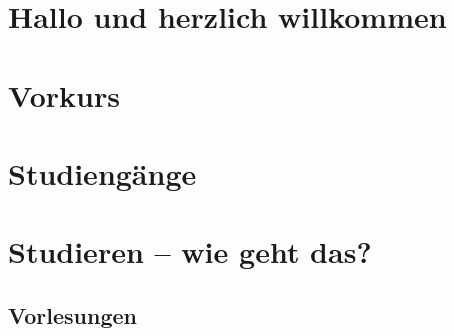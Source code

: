\documentclass[ngerman,a4paper,openany,showtrims]{memoir}
\begin{document}
\pagestyle{empty}

\frontmatter

\tableofcontents

\mainmatter
\pagestyle{plain}

\chapter{Hallo und herzlich willkommen}


\chapter{Vorkurs}





\chapter{Studiengänge}









\chapter{Studieren -- wie geht das?}

\section{Vorlesungen}












\end{document}
